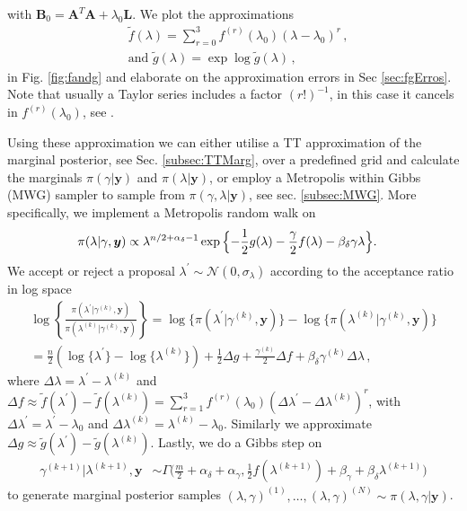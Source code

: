 with $\bm{B}_0 = \bm{A}^T  \bm{A} + \lambda_0 \bm{L}$.
We plot the approximations
\begin{subequations}
	\label{eq:fandg}
	\begin{align}
		&\tilde{f} ( \lambda) = \sum^3_{r=0} 	f^{(r)}(\lambda_0) (\lambda-\lambda_0)^r  \label{eq:fAprox} \, ,  \\
		&\text{and } \tilde{g} (\lambda) = \exp \log{\tilde{g}(\lambda)}  \label{eq:gAprox} \, ,
	\end{align}
\end{subequations} in Fig. \ref{fig:fandg} and elaborate on the approximation errors in Sec \ref{sec:fgErros}.
Note that usually a Taylor series includes a factor $(r!)^{-1}$, in this case it cancels in $f^{(r)}(\lambda_0)$, see \cite{fox2016fast}.

Using these approximation we can either utilise a TT approximation of the marginal posterior, see Sec. \ref{subsec:TTMarg}, over a predefined grid and calculate the marginals $\pi(\gamma|\bm{y})$ and $\pi(\lambda|\bm{y})$, or employ a Metropolis within Gibbs (MWG) sampler to sample from $\pi(\gamma,\lambda|\bm{y})$, see sec. \ref{subsec:MWG}.
More specifically, we implement a Metropolis random walk on
\begin{align}
	\label{eq:margApplCondGam}
	\pi(\lambda | \gamma, \bm{y}) &\propto \lambda^{n/2+\alpha_\delta -1} \exp{\Bigl\{ - \frac{1}{2} g ( \lambda) - \frac{\gamma}{2} f ( \lambda) - \beta_\delta \gamma \lambda \Bigr\}}.
\end{align} 
We accept or reject a proposal $\lambda^{\prime} \sim \mathcal{N}(0, \sigma_{\lambda})$ according to the acceptance ratio in log space
\begin{align} 
	\log \left\{ \frac{\pi(\lambda^{\prime} | \gamma^{(k)}, \bm{y})  }{\pi(\lambda^{(k)}| \gamma^{(k)}, \bm{y})}  \right\} 
	= \log  \{\pi(\lambda^{\prime} | \gamma^{(k)}, \bm{y} ) \}  -\log  \{ \pi(\lambda^{(k)}| \gamma^{(k)}, \bm{y}) \} \\
	= \frac{n}{2} (\log\{\lambda^{\prime}\} - \log\{\lambda^{(k)}\} ) + \frac{1}{2} \Delta g + \frac{\gamma^{(k)}}{2} \Delta f  + \beta_\delta \gamma^{(k)} \Delta \lambda  \, ,
\end{align}
where $\Delta \lambda = \lambda^{\prime} - \lambda^{(k)} $ and  $\Delta f \approx \tilde{f}(\lambda^\prime) - \tilde{f}(\lambda^{(k)}) = \sum^3_{r = 1} f^{(r)} (\lambda_0) (\Delta \lambda^\prime - \Delta \lambda^{(k)})^r $, with  $\Delta \lambda^{\prime} = \lambda^\prime - \lambda_0 $ and $\Delta \lambda^{(k)} =  \lambda^{(k)} - \lambda_0$.
Similarly we approximate $\Delta g \approx \tilde{g}(\lambda^{\prime}) -\tilde{g}(\lambda^{(k)})$.
Lastly, we do a Gibbs step on
\begin{align}
	\gamma^{(k+1)} |  \lambda^{(k+1)}, \bm{y} &\sim \Gamma \bigg( \frac{m}{2} + \alpha_\delta + \alpha_\gamma, \frac{1}{2} f (\lambda^{(k+1)}) + \beta_\gamma + \beta_\delta \lambda^{(k+1)} \bigg)\label{eq:GibbsStep}
\end{align} 
to generate marginal posterior samples $(\lambda, \gamma)^{(1)}, \dots, (\lambda, \gamma)^{(N)} \sim  \pi(\lambda, \gamma| \bm{y})$.

